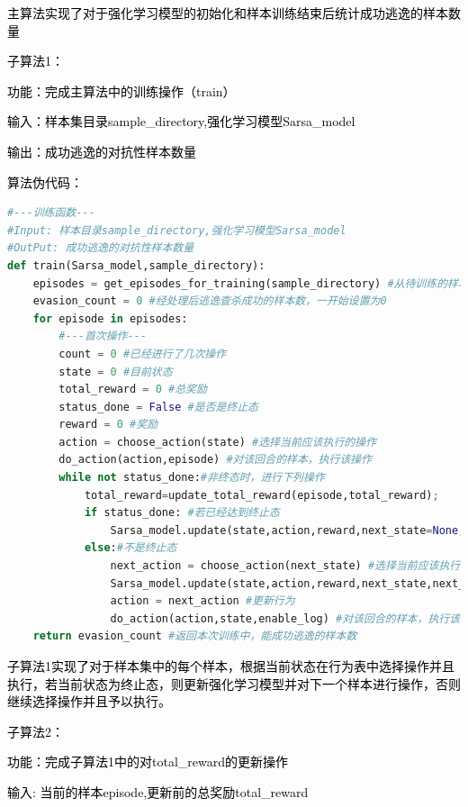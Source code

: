 \textcolor{black}{主算法实现了对于强化学习模型的初始化和样本训练结束后统计成功逃逸的样本数量}

\textcolor{black}{子算法1：}

\textcolor{black}{功能：完成主算法中的训练操作（train）}

\textcolor{black}{输入：样本集目录sample\_directory,强化学习模型Sarsa\_model}

\textcolor{black}{输出：成功逃逸的对抗性样本数量}

\textcolor{black}{算法伪代码：}

\begin{lstlisting}[language=Python, caption={}, label={lst:pythonfile2}]
#---训练函数---
#Input: 样本目录sample_directory,强化学习模型Sarsa_model 
#OutPut: 成功逃逸的对抗性样本数量
def train(Sarsa_model,sample_directory):
    episodes = get_episodes_for_training(sample_directory) #从待训练的样本集路径中获取所有待训练样本
    evasion_count = 0 #经处理后逃逸查杀成功的样本数，一开始设置为0
    for episode in episodes:
        #---首次操作---
        count = 0 #已经进行了几次操作
        state = 0 #目前状态
        total_reward = 0 #总奖励
        status_done = False #是否是终止态
        reward = 0 #奖励
        action = choose_action(state) #选择当前应该执行的操作
        do_action(action,episode) #对该回合的样本，执行该操作
        while not status_done:#非终态时，进行下列操作
            total_reward=update_total_reward(episode,total_reward);
            if status_done: #若已经达到终止态
                Sarsa_model.update(state,action,reward,next_state=None,next_action=None) #更新Sarsa强化学习模型
            else:#不是终止态
                next_action = choose_action(next_state) #选择当前应该执行的操作
                Sarsa_model.update(state,action,reward,next_state,next_action) #更新Sarsa强化学习模型
                action = next_action #更新行为
                do_action(action,state,enable_log) #对该回合的样本，执行该操作
    return evasion_count #返回本次训练中，能成功逃逸的样本数
\end{lstlisting}

\textcolor{black}{子算法1实现了对于样本集中的每个样本，根据当前状态在行为表中选择操作并且执行，若当前状态为终止态，则更新强化学习模型并对下一个样本进行操作，否则继续选择操作并且予以执行。}

\textcolor{black}{子算法2：}

\textcolor{black}{功能：完成子算法1中的对total\_reward的更新操作}

\textcolor{black}{输入: 当前的样本episode,更新前的总奖励total\_reward}

